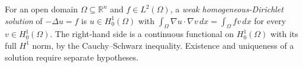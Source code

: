 
For an open domain $\Omega\subseteq\mathbb R^n$ and $f\in L^2(\Omega)$, a \emph{weak homogeneous-Dirichlet solution} of $-\Delta u=f$ is $u\in H_0^1(\Omega)$ with $\int_\Omega\nabla u\cdot\nabla v\,dx=\int_\Omega fv\,dx$ for every $v\in H_0^1(\Omega)$. The right-hand side is a continuous functional on $H_0^1(\Omega)$ with its full $H^1$ norm, by the Cauchy--Schwarz inequality. Existence and uniqueness of a solution require separate hypotheses.
